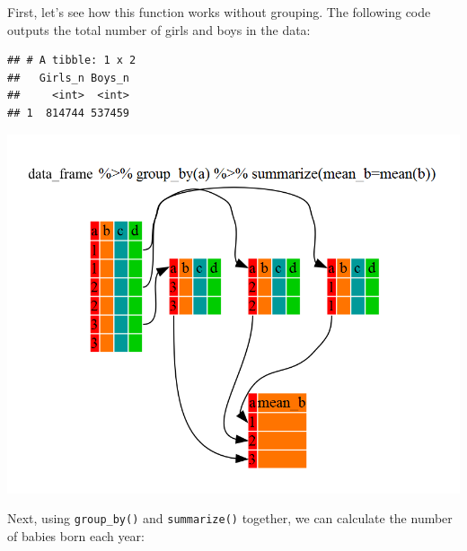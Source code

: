 \documentclass[]{book}
\newenvironment{Shaded}{\begin{snugshade}}{\end{snugshade}}
\newcommand{\DataTypeTok}[1]{\textcolor[rgb]{0.13,0.29,0.53}{#1}}
\newcommand{\KeywordTok}[1]{\textcolor[rgb]{0.13,0.29,0.53}{\textbf{#1}}}
\newcommand{\NormalTok}[1]{#1}
\newcommand{\OperatorTok}[1]{\textcolor[rgb]{0.81,0.36,0.00}{\textbf{#1}}}
\newcommand{\StringTok}[1]{\textcolor[rgb]{0.31,0.60,0.02}{#1}}
\begin{document}
First, let's see how this function works without grouping. The following
code outputs the total number of girls and boys in the data:

\begin{Shaded}
\end{Shaded}

\begin{verbatim}
## # A tibble: 1 x 2
##   Girls_n Boys_n
##     <int>  <int>
## 1  814744 537459
\end{verbatim}

\includegraphics{R/Rintro/images/split-apply-combine.png}

Next, using \texttt{group\_by()} and \texttt{summarize()} together, we can calculate the
number of babies born each year:

\begin{Shaded}
\end{Shaded}
\end{document}
